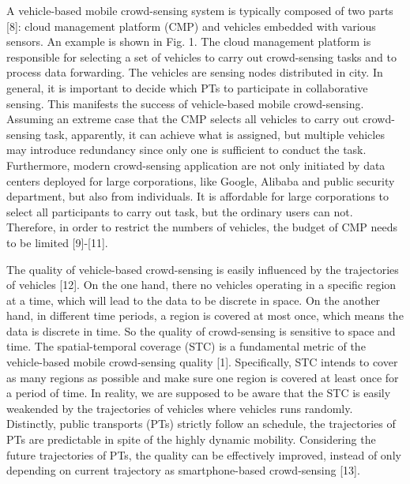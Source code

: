 \documentclass[journal]{IEEEtran}
\begin{document}
A vehicle-based mobile crowd-sensing system is typically composed of two parts [8]: cloud management platform (CMP) and vehicles embedded with various sensors. An example is shown in Fig. 1. The cloud management platform is responsible for selecting a set of vehicles to carry out crowd-sensing tasks and to process data forwarding. The vehicles are sensing nodes distributed in city. In general, it is important to decide which PTs to participate in collaborative sensing. This manifests the success of vehicle-based mobile crowd-sensing. Assuming an extreme case that the CMP selects all vehicles to carry out crowd-sensing task, apparently, it can achieve what is assigned, but multiple vehicles may introduce redundancy since only one is sufficient to conduct the task. Furthermore, modern crowd-sensing application are not only initiated by data centers deployed for large corporations, like Google, Alibaba and public security department, but also from individuals. It is affordable for large corporations to select all participants to carry out task, but the ordinary users can not. Therefore, in order to restrict the numbers of vehicles, the budget of CMP needs to be limited [9]-[11].

The quality of vehicle-based crowd-sensing is easily influenced by the trajectories of vehicles [12]. On the one hand, there  no vehicles operating in a specific region at a time, which will lead to the data to be discrete in space. On the another hand, in different time periods, a region is covered at most once, which means the data is discrete in time. So the quality of crowd-sensing is sensitive to space and time. The spatial-temporal coverage (STC) is a fundamental metric of the vehicle-based mobile crowd-sensing quality [1]. Specifically, STC intends to cover as many regions as possible and make sure one region is covered at least once for a period of time. In reality, we are supposed to be aware that the STC is easily weakended by the trajectories of vehicles where vehicles runs randomly. Distinctly, public transports (PTs) strictly follow an schedule, the trajectories of PTs are predictable in spite of the highly dynamic mobility. Considering the future trajectories of PTs, the quality can be effectively improved, instead of only depending on current trajectory as smartphone-based crowd-sensing [13].
\end{document}
